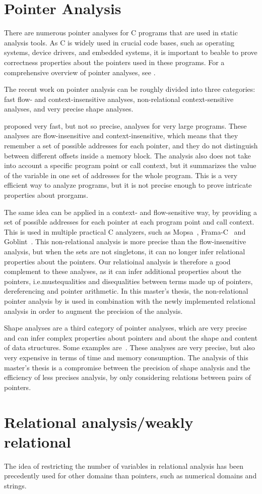 \section{Pointer Analysis}


There are numerous pointer analyses for C programs that are used in static analysis tools.
As C is widely used in crucial code bases, such as operating systems, device drivers, and embedded systems,
it is important to beable to prove correctness properties about the pointers used in these programs.
For a comprehensive overview of pointer analyses, see \textcite{pointeranalysis}.

The recent work on pointer analysis can be roughly divided into three categories:
fast flow- and context-insensitive analyses, non-relational context-sensitive analyses, and very precise shape analyses.

\textcite{Andersen,Steensgaard} proposed very fast, but not so precise, analyses for very large programs.
These analyses are flow-insensitive and context-insensitive, which means that they remember a set of possible
addresses for each pointer, and they do not distinguish between different offsets inside a memory block.
The analysis also does not take into account a specific program point or call context, but it summarizes the
value of the variable in one set of addresses for the whole program.
This is a very efficient way to analyze programs, but it is not precise enough to prove intricate properties about prorgams.

The same idea can be applied in a context- and flow-sensitive way, by providing a set of possible addresses for each pointer at each program point and call context.
This is used in multiple practical C analyzers, such as \textsf{Mopsa}~\cite{mopsa}, \textsf{Frama-C}~\cite{framac,Bühler2024} and \textsf{Goblint}~\cite{goblint}.
This non-relational analysis is more precise than the flow-insensitive analysis, but when the sets are not singletons,
it can no longer infer relational properties about the pointers.
Our relatioinal analysis is therefore a good complement to these analyses, as it can infer additional
properties about the pointers, i.e.mustequalities and disequalities between terms made up of pointers, dereferencing and pointer arithmetic.
In this master's thesis, the non-relational pointer analysis by \textcite{goblint} is used in combination
with the newly implemented relational analysis in order to augment the precision of the analysis.

Shape analyses are a third category of pointer analyses, which are very precise and can infer complex properties about pointers and about the shape and content of data structures.
Some examples are~\cite{shapeanalysis,kreiker,separationlogic,rivalpapers,predator,Lemerre2024}.
These analyses are very precise, but also very expensive in terms of time and memory consumption.
The analysis of this master's thesis is a compromise between the precision of shape analysis and
the efficiency of less precises analysis, by only considering relations between pairs of pointers.

\section{Relational analysis/weakly relational}

The idea of restricting the number of variables in relational analysis has been precedently used
for other domains than pointers, such as numerical domains and strings.
